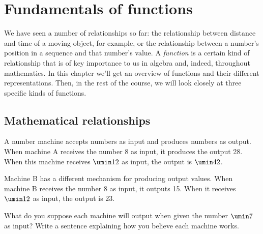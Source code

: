 \chapter{Fundamentals of functions}
\label{ch:functions}



We have seen a number of relationships so far: the relationship between distance and time of a moving object, for example, or the relationship between a number's position in a sequence and that number's value. A \textit{function} is a certain kind of relationship that is of key importance to us in algebra and, indeed, throughout mathematics. In this chapter we'll get an overview of functions and their different representations. Then, in the rest of the course, we will look closely at three specific kinds of functions.

\section{Mathematical relationships}
\label{sec:mathrelationships}


\begin{boxexplore}
A number machine accepts numbers as input and produces numbers as output. When machine A receives the number 8 as input, it produces the output 28. When this machine receives $\umin12$ as input, the output is $\umin42$.

Machine B has a different mechanism for producing output values. When machine B receives the number 8 as input, it outputs 15. When it receives $\umin12$ as input, the output is $23$.

What do you suppose each machine will output when given the number $\umin7$ as input? Write a sentence explaining how you believe each machine works.
\end{boxexplore} %

